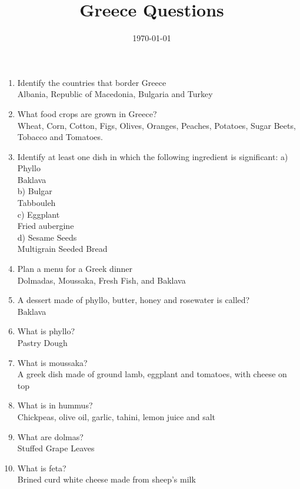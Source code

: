 \documentclass[11pt]{article}
\date{\today}
\title{Greece Questions}
\begin{document}
\maketitle
\tableofcontents

\begin{enumerate}
\item Identify the countries that border Greece\\
Albania, Republic of Macedonia, Bulgaria and Turkey
\item What food crops are grown in Greece?\\
Wheat, Corn, Cotton, Figs, Olives, Oranges, Peaches, Potatoes, Sugar Beets, Tobacco and Tomatoes.
\item Identify at least one dish in which the following ingredient is significant:
a) Phyllo\\
   Baklava\\
b) Bulgar\\
   Tabbouleh\\
c) Eggplant\\
   Fried aubergine\\
d) Sesame Seeds\\
    Multigrain Seeded Bread
\item Plan a menu for a Greek dinner\\
Dolmadas, Moussaka, Fresh Fish, and Baklava
\item A dessert made of phyllo, butter, honey and rosewater is called?\\
Baklava
\item What is phyllo?\\
Pastry Dough
\item What is moussaka?\\
A greek dish made of ground lamb, eggplant and tomatoes, with cheese on top
\item What is in hummus?\\
Chickpeas, olive oil, garlic, tahini, lemon juice and salt
\item What are dolmas?\\
Stuffed Grape Leaves
\item What is feta?\\
Brined curd white cheese made from sheep's milk
\end{enumerate}
\end{document}
